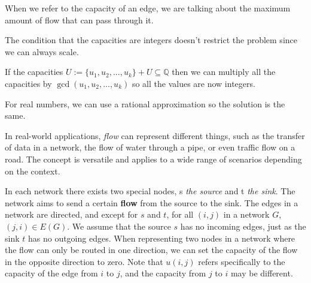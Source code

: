 When we refer to the capacity of an edge, we are talking about the maximum amount of flow that can pass through it.

\begin{obs}
    The condition that the capacities are integers doesn't restrict the problem since we can always scale.

    If the capacities $U:= \{u_1, u_2, ..., u_k\} + U \subseteq \mathbb{Q}$ then we can multiply all the capacities by $ \gcd (u_1, u_2, ..., u_k)$ so all the values are now integers.

    For real numbers, we can use a rational approximation so the solution is the same.
\end{obs}

In real-world applications, \textit{flow} can represent different things, such as the transfer of data in a network, the flow of water through a pipe, or even traffic flow on a road. The concept is versatile and applies to a wide range of scenarios depending on the context.

In each network there exists two special nodes, s \textit{the source} and t \textit{the sink}. The network aims to send a certain \textbf{flow} from the source to the sink.
The edges in a network are directed, and except for $s$ and $t$, for all $(i,j)$ in a network $G$, $(j,i) \in E(G)$. We assume that the source $s$ has no incoming edges, just as the sink $t$ has no outgoing edges.
When representing two nodes in a network where the flow can only be routed in one direction, we can set the capacity of the flow in the opposite direction to zero.
Note that $u(i,j)$ refers specifically to the capacity of the edge from $i$ to $j$, and the capacity from $j$ to $i$ may be different.

